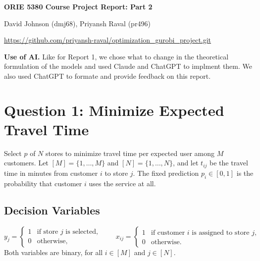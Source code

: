 \documentclass{article}
\begin{document}
\begin{center}
{\Large\bfseries ORIE 5380 Course Project Report: Part 2 \par}
\vspace{1.2em}
{\normalsize David Johnson (dmj68), Priyansh Raval (pr496) \par}
\vspace{0.4em}
{\small\url{https://github.com/priyansh-raval/optimization_gurobi_project.git} \par}
\vspace{2em}
\end{center}

\newcommand{\todo}[1]{\par\textcolor{urlBlue}{\textbf{TODO:} #1}\par}
\newcommand{\figureplaceholder}[1]{%
  \begin{center}\fbox{\parbox[c][1.0in][c]{0.90\textwidth}{\centering #1}}\end{center}}

\textbf{Use of AI.}
Like for Report 1, we chose what to change in the theoretical formulation of the models
and used Claude and ChatGPT to implment them. We also used ChatGPT to formate and provide feedback on this report.

\section*{Question 1: Minimize Expected Travel Time}

Select $p$ of $N$ stores to minimize travel time per expected user among $M$ customers.
Let $[M]=\{1,\ldots,M\}$ and $[N]=\{1,\ldots,N\}$, and let $t_{ij}$ be the travel time in minutes from customer $i$ to store $j$.
The fixed prediction $p_i\in[0,1]$ is the probability that customer $i$ uses the service at all.

\subsection*{Decision Variables}
\[
y_j = \begin{cases}
1 & \text{if store $j$ is selected},\\
0 & \text{otherwise},
\end{cases}
\qquad
x_{ij} = \begin{cases}
1 & \text{if customer $i$ is assigned to store $j$},\\
0 & \text{otherwise}.
\end{cases}
\]
Both variables are binary, for all $i\in[M]$ and $j\in[N]$.
\end{document}
